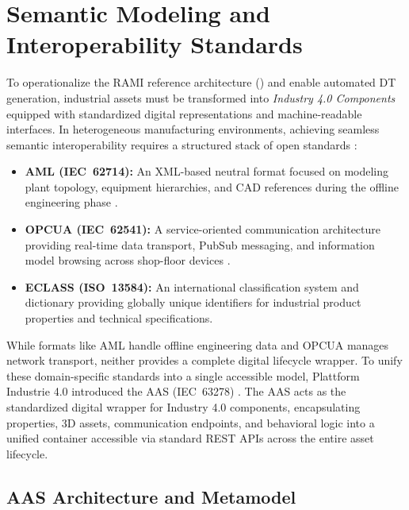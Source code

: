 \section{Semantic Modeling and Interoperability Standards}
\label{sec:semantic_interoperability}

To operationalize the \gls{RAMI} reference architecture () and enable automated \gls{DT} generation, industrial assets must be transformed into \textit{Industry 4.0 Components} equipped with standardized digital representations and machine-readable interfaces. In heterogeneous manufacturing environments, achieving seamless semantic interoperability requires a structured stack of open standards \cite{Barnard2024,Ahvanouee2025}:
\begin{itemize}
    \item \textbf{\gls{AML} (\gls{IEC}~62714):} An \gls{XML}-based neutral format focused on modeling plant topology, equipment hierarchies, and \gls{CAD} references during the offline engineering phase \cite{Drath2008,Barnard2024}.
    \item \textbf{\gls{OPCUA} (\gls{IEC}~62541):} A service-oriented communication architecture providing real-time data transport, \gls{PubSub} messaging, and information model browsing across shop-floor devices \cite{Pajpach2023,Barnard2024}.
    \item \textbf{\gls{ECLASS} (\gls{ISO}~13584):} An international classification system and dictionary providing globally unique identifiers for industrial product properties and technical specifications.
\end{itemize}

While formats like \gls{AML} handle offline engineering data and \gls{OPCUA} manages network transport, neither provides a complete digital lifecycle wrapper. To unify these domain-specific standards into a single accessible model, Plattform Industrie 4.0 introduced the \gls{AAS} (\gls{IEC}~63278) \cite{Abdel-Aty2022,Pajpach2025}. The \gls{AAS} acts as the standardized digital wrapper for Industry 4.0 components, encapsulating properties, 3D assets, communication endpoints, and behavioral logic into a unified container accessible via standard \gls{REST} \glspl{API} across the entire asset lifecycle.

\subsection{\texorpdfstring{\gls{AAS}}{AAS} Architecture and Metamodel}
\label{subsec:aas_deep_dive}

